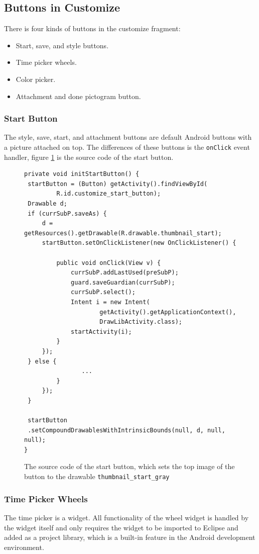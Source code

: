 \subsection*{Buttons in Customize}
There is four kinds of buttons in the customize fragment:

\begin{itemize}
	\item Start, save, and style buttons.
	\item Time picker wheels.
	\item Color picker.
	\item Attachment and done pictogram button.
\end{itemize}

\subsubsection*{Start Button}
The style, save, start, and attachment buttons are default Android buttons with a picture attached on top.
The differences of these buttons is the \texttt{onClick} event handler, figure \ref{code:customize:start_button} is the source code of the start button.

\begin{figure}[H]
\begin{lstlisting}
private void initStartButton() {
 startButton = (Button) getActivity().findViewById(
		 R.id.customize_start_button);
 Drawable d;
 if (currSubP.saveAs) {
	 d = getResources().getDrawable(R.drawable.thumbnail_start);
	 startButton.setOnClickListener(new OnClickListener() {

		 public void onClick(View v) {
			 currSubP.addLastUsed(preSubP);
			 guard.saveGuardian(currSubP);
			 currSubP.select();
			 Intent i = new Intent(
					 getActivity().getApplicationContext(),
					 DrawLibActivity.class);
			 startActivity(i);
		 }
	 });
 } else {
				...
		 }
	 });
 }

 startButton
 .setCompoundDrawablesWithIntrinsicBounds(null, d, null, null);
}
\end{lstlisting}
\caption{The source code of the start button, which sets the top image of the button to the drawable \texttt{thumbnail\_start\_gray}}%
\label{code:customize:start_button}%
\end{figure}

\subsubsection*{Time Picker Wheels}
The time picker is a widget\cite{web:android:customize:wheel}.
All functionality of the wheel widget is handled by the widget itself and only requires the widget to be imported to Eclipse and added as a project library, which is a built-in feature in the Android development environment.

